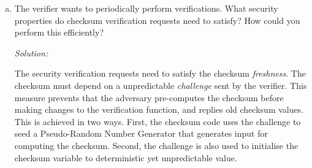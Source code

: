 \documentclass[a4paper,11pt]{article}
\newenvironment{solution}%
{\par{\noindent\small\textit{Solution:}}\vspace{-12pt}\begin{framed}}%
{\end{framed}\par}
\begin{document}
\begin{enumerate}[(a)]
\ifsolution\begin{solution}
A break point right after the checksum computation, it will increase the time within the verifier receives the checksum. The verifier detects such a situation by measuring the time elapsed from sending the nonce until receiving the checksum. If this time exceeds a certain threshold, the verifier skips the checksum verification and exits with a failure.  
\end{solution}\fi

\item The verifier wants to periodically perform verifications. What security
properties do checksum verification requests need to satisfy? How could you
perform this efficiently?

\ifsolution\begin{solution}
The security verification requests need to satisfy the checksum \emph{freshness}. The checksum must depend on a unpredictable \emph{challenge} sent by the verifier. This measure prevents that the adversary pre-computes the checksum before making changes to the verification function, and replies old checksum values. This is achieved in two ways. First, the checksum code uses the challenge to seed a Pseudo-Random Number Generator that generates input for computing the checksum. Second, the challenge is also used to initialise the checksum variable to deterministic yet unpredictable value.
\end{solution}\fi

\end{enumerate}
\end{document}
